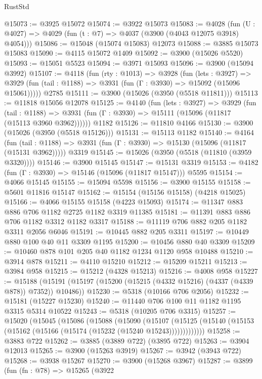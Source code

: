 \begin{lexlean}{RustStd}
\begin{coremodule}
@15073 := @3925 @15072
@15074 := @3922 @15073
@15083 := @4028
    (fun (U : @4027) => @4029 (fun (t : @7) => @4037 (@3900 (@4043 @12075 @3918) @4054)))
@15086 := @15048 (@15074 @15083) @12073
@15088 := @3885 @15073 @15083
@15090 := @4115 @15072 @1409
@15092 := @3900 (@15026 @5520)
@15093 := @15051 @5523
@15094 := @3971 @15093
@15096 := @3900 (@15094 @3992)
@15107 := @4118
    (fun (rty : @1013) =>
    @3928
      (fun (lets : @3927) =>
      @3929 (fun (tail : @1188) => @3931 (fun (Γ : @3930) => @15092 (@15096 @15061)))))
    @2785
@15111 := @3900 (@15026 (@3950 (@5518 @11811)))
@15113 := @11818 @15056 @12078
@15125 := @4140
    (fun (lets : @3927) =>
    @3929
      (fun (tail : @1188) =>
      @3931 (fun (Γ : @3930) => @15111 (@15096 (@11817 (@15113 @3960 @3962))))))
    @1182
@15126 := @11810 @4166
@15130 := @3900 (@15026 (@3950 (@5518 @15126)))
@15131 := @15113 @1182
@15140 := @4164
    (fun (tail : @1188) => @3931 (fun (Γ : @3930) => @15130 (@15096 (@11817 (@15131 @3962)))))
    @3319
@15145 := @15026 (@3950 (@5518 (@11810 (@3959 @3320))))
@15146 := @3900 @15145
@15147 := @15131 @3319
@15153 := @4182 (fun (Γ : @3930) => @15146 (@15096 (@11817 @15147))) @5595
@15154 := @4066 @15145
@15155 := @15094 @5598
@15156 := @3900 @15155
@15158 := @5601 @11816 @15147
@15162 := @15154 (@15156 @15158) (@4218 @15025)
@15166 := @4066 @15155 @15158 (@4223 @15093)
@15174 := @11347 @883 @886 @706 @1182 @2725 @1182 @3319 @11385
@15181 := @11391 @883 @886 @706 @1182 @3312 @1182 @3317
@15188 := @11119 @706 @882 @205 @1182 @3311 @2056 @6046
@15191 := @10445 @882 @205 @3311
@15197 := @10449 @880 @100 @40 @11 @3309 @1195
@15200 := @10456 @880 @40 @3309
@15209 := @10460 @878 @101 @205 @40 @1182 @1234 @1120 @958 @10488
@15210 := @3914 @878
@15211 := @4110 @15210
@15212 := @15209 @15211
@15213 := @3984 @958
@15215 := @15212 (@4328 @15213)
@15216 := @4008 @958
@15227 := @15188
    (@15191 (@15197 (@15200 (@15215 (@4332 @15216) (@4337 (@4339 @878)) @7352)) @10486))
@15230 := @5318 (@10166 @706 @2056)
@15232 := @15181 (@15227 @15230)
@15240 := @11440 @706 @100 @11 @1182 @1195 @3315 @5314 @10522
@15243 := @5318 (@10205 @706 @3315)
@15257 := @15020
    (@15045
      (@15086
        (@15088
          (@15090
            (@15107
              (@15125 (@15140 (@15153 (@15162 (@15166 (@15174 (@15232 (@15240 @15243)))))))))))))
@15258 := @3883 @722
@15262 := @3885 (@3889 @722) (@3895 @722)
@15263 := @3904 @12013
@15265 := @3900 (@15263 @3919)
@15267 := @3942 (@3943 @722)
@15268 := @3938 @15267
@15270 := @3900 (@15268 @3967)
@15287 := @3899
    (fun (fn : @78) =>
    @15265
      (@3922

\end{coremodule}
\end{lexlean}

